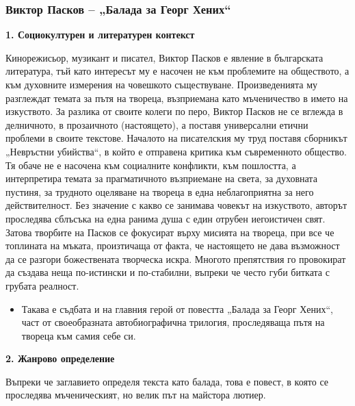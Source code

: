 \documentclass[12pt,a4paper]{article}
\begin{document}
\newpage

\subsubsection{\colorbox{green!40}{Виктор Пасков – „Балада за Георг Хених“}}
\vspace{0.1cm}
\textbf{1. Социокултурен и литературен контекст}
\vspace{0.1cm}

\indent Кинорежисьор, музикант и писател, Виктор Пасков е явление в българската литература, тъй като интересът му е насочен не към проблемите на обществото, а към духовните измерения на човешкото съществуване. Произведенията му разглеждат темата за пътя на твореца, възприемана като мъченичество в името на изкуството. За разлика от своите колеги по перо, Виктор Пасков не се вглежда в делничното, в прозаичното (настоящето), а поставя универсални етични проблеми в своите текстове. Началото на писателския му труд поставя сборникът „Невръстни убийства“, в който е отправена критика към съвременното общество. Тя обаче не е насочена към социалните конфликти, към пошлостта, а интерпретира темата за прагматичното възприемане на света, за духовната пустиня, за трудното оцеляване на твореца в една неблагоприятна за него действителност. Без значение с какво се занимава човекът на изкуството, авторът проследява сблъсъка на една ранима душа с един отрубен иегоистичен свят. Затова творбите на Пасков се фокусират върху мисията на твореца, при все че топлината на мъката, произтичаща от факта, че настоящето не дава възможност да се разгори божествената творческа искра. Многото препятствия го провокират да създава неща по-истински и по-стабилни, въпреки че често губи битката с грубата реалност.

\vspace{0.1cm}
\begin{itemize}[leftmargin=*, noitemsep, topsep=2pt, parsep=0pt]
    \item Такава е съдбата и на главния герой от повестта „Балада за Георг Хених“, част от своеобразната автобиографична трилогия, проследяваща пътя на твореца към самия себе си.
\end{itemize}

\vspace{0.1cm}
\textbf{2. Жанрово определение}
\vspace{0.1cm}

\indent Въпреки че заглавието определя текста като балада, това е повест, в която се проследява мъченическият, но велик път на майстора лютиер.
\end{document}
